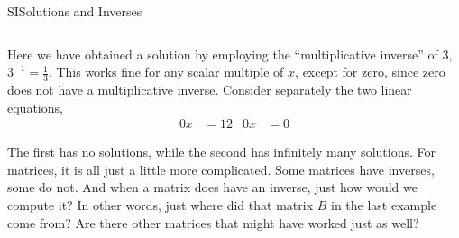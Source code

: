 \begin{subsect}{SI}{Solutions and Inverses}
\begin{para}
\begin{equation*}
\end{equation*}
\end{para}
%
\begin{para}Here we have obtained a solution by employing the ``multiplicative inverse'' of $3$, $3^{-1}=\frac{1}{3}$.  This works fine for any scalar multiple of $x$, except for zero, since zero does not have a multiplicative inverse.  Consider separately the two linear equations,
%
\begin{align*}
0x&=12
&
0x&=0
\end{align*}
\end{para}
%
\begin{para}The first has no solutions, while the second has infinitely many solutions.  For matrices, it is all just a little more complicated.  Some matrices have inverses, some do not.  And when a matrix does have an inverse, just how would we compute it?  In other words, just where did that matrix $B$ in the last example come from?  Are there other matrices that might have worked just as well?\end{para}
%
\end{subsect}
%
